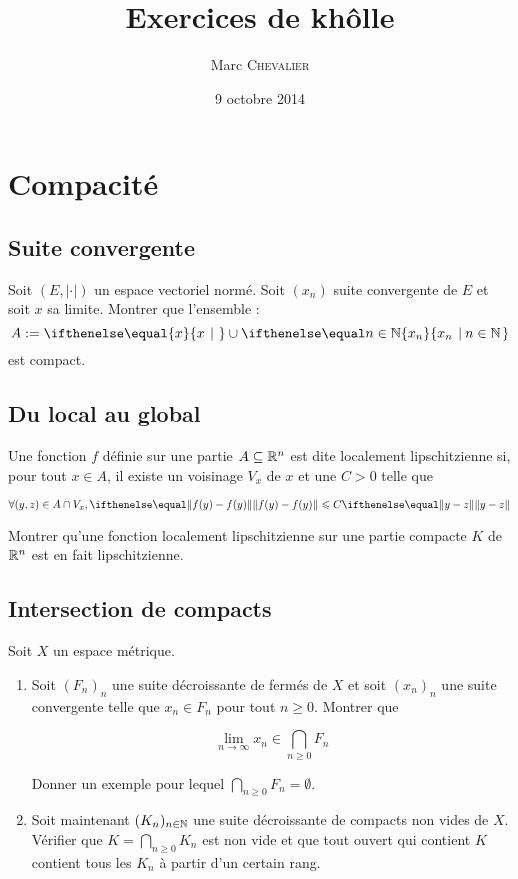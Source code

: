 

\title{Exercices de khôlle}
\author{Marc \textsc{Chevalier}}
\date{9 octobre 2014}


\maketitle
\setcounter{tocdepth}{2}
\tableofcontents

\section{Compacité}

\subsection{Suite convergente}

Soit $(E,\vert\cdot\vert)$ un espace vectoriel normé. Soit $(x_n)$ suite convergente de $E$ et soit $x$ sa limite. Montrer que l'ensemble :
\[
    A:= \set{x}{}\cup \set{x_n}{n\in \NN}
\]
est compact.

\subsection{Du local au global}

Une fonction $f$ définie sur une partie $A\subseteq \mathbb{R}^n$ est dite localement lipschitzienne si, pour tout $x\in A$, il existe un voisinage $V_x$ de $x$ et une $C>0$ telle que 

\[
    \forall (y,z)\in A\cap V_x, \norme{f(y) - f(y)}{} \leqslant C \norme{y-z}{}
\]

Montrer qu'une fonction localement lipschitzienne sur une partie compacte $K$ de $\mathbb{R}^n$ est en fait lipschitzienne.

\subsection{Intersection de compacts}

Soit $X$ un espace métrique.
\begin{enumerate}

    \item Soit $(F_n)_n$ une suite décroissante de fermés de $X$ et soit $(x_n)_n$ une suite convergente telle que $x_n\in F_n $ pour tout $n \geqslant 0$. Montrer que

\[
    \lim_{n\to \infty} x_n \in \bigcap_{n\geqslant 0} F_n
\]

Donner un exemple pour lequel $\bigcap_{n\geqslant 0} F_n = \emptyset$. 
    
    \item Soit maintenant $(K_n)_{n\in\mathbb{N}}$ une suite décroissante de compacts non vides de $X$. Vérifier que $K = \bigcap\limits_{n\geqslant 0} K_n$ est non vide et que tout ouvert qui contient $K$ contient tous les $K_n$ à partir d'un certain rang.


\end{enumerate}

